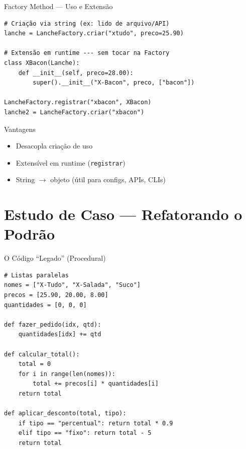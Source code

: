 \documentclass[aspectratio=169]{beamer}
\begin{document}
\begin{frame}{Factory Method --- Uso e Extensão}
\begin{lstlisting}
# Criação via string (ex: lido de arquivo/API)
lanche = LancheFactory.criar("xtudo", preco=25.90)

# Extensão em runtime --- sem tocar na Factory
class XBacon(Lanche):
    def __init__(self, preco=28.00):
        super().__init__("X-Bacon", preco, ["bacon"])

LancheFactory.registrar("xbacon", XBacon)
lanche2 = LancheFactory.criar("xbacon")
\end{lstlisting}

\begin{exampleblock}{Vantagens}
\begin{itemize}
  \item Desacopla criação de uso
  \item Extensível em runtime (\texttt{registrar})
  \item String $\to$ objeto (útil para configs, APIs, CLIs)
\end{itemize}
\end{exampleblock}
\end{frame}

\section{Estudo de Caso --- Refatorando o Podrão}

\begin{frame}{O Código ``Legado'' (Procedural)}
\begin{lstlisting}
# Listas paralelas
nomes = ["X-Tudo", "X-Salada", "Suco"]
precos = [25.90, 20.00, 8.00]
quantidades = [0, 0, 0]

def fazer_pedido(idx, qtd):
    quantidades[idx] += qtd

def calcular_total():
    total = 0
    for i in range(len(nomes)):
        total += precos[i] * quantidades[i]
    return total

def aplicar_desconto(total, tipo):
    if tipo == "percentual": return total * 0.9
    elif tipo == "fixo": return total - 5
    return total
\end{lstlisting}
\end{frame}
\end{document}
